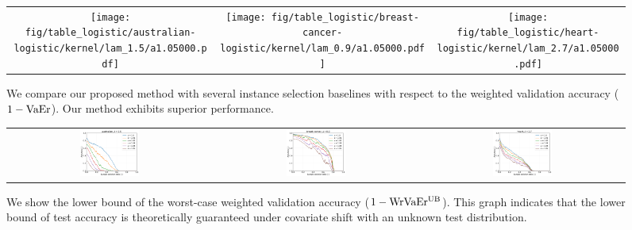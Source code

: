	\begin{figure}[tb]
		\begin{center}
			\begin{tabular}{ccc}
				\texttt{[image: fig/table\_logistic/australian-logistic/kernel/lam\_1.5/a1.05000.pdf]} &
				\texttt{[image: fig/table\_logistic/breast-cancer-logistic/kernel/lam\_0.9/a1.05000.pdf]} &
				\texttt{[image: fig/table\_logistic/heart-logistic/kernel/lam\_2.7/a1.05000.pdf]}
			\end{tabular}
		\end{center}
		\caption{We compare our proposed method with several instance selection baselines with respect to the weighted validation accuracy ($1-{\rm VaEr}$). Our method exhibits superior performance.}
		\label{fig:result-table-acc}
		\begin{center}
			\begin{tabular}{ccc}
				\includegraphics[width=0.30\textwidth]{fig/table_logistic/australian-logistic/kernel/kernel_ss_screening_rate_lam1.5_x_n_y_etest} &
				\includegraphics[width=0.30\textwidth]{fig/table_logistic/breast-cancer-logistic/kernel/kernel_ss_screening_rate_lam0.9_x_n_y_etest} &
				\includegraphics[width=0.30\textwidth]{fig/table_logistic/heart-logistic/kernel/kernel_ss_screening_rate_lam2.7_x_n_y_etest}
			\end{tabular}
		\end{center}
		\caption{We show the lower bound of the worst-case weighted validation accuracy ($1 - {\rm WrVaEr^{\rm UB}}$). This graph indicates that the lower bound of test accuracy is theoretically guaranteed under covariate shift with an unknown test distribution.}
		\label{fig:result-table-guarantee}
	\end{figure}

